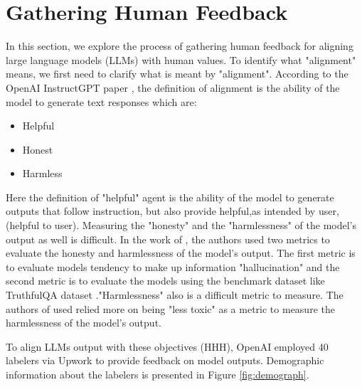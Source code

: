 \section{Gathering Human Feedback}
\label{sec:gather-feedback}

In this section, we explore the process of gathering human feedback for aligning large language models (LLMs) with human values. To identify what "alignment" means, we first need to clarify what is meant by "alignment". According to the OpenAI InstructGPT paper \cite{ouyangTrainingLanguageModels2022}, the definition of alignment is the ability of the model to generate text responses which are: 
\begin{itemize}
    \item Helpful
    \item Honest
    \item Harmless
\end{itemize}

Here the definition of "helpful" agent is the ability of the model to generate outputs that follow instruction, but also provide helpful,as intended by user, (helpful to user). Measuring the "honesty" and the "harmlessness" of the model's output as well is difficult. In the work of \cite{ouyangTrainingLanguageModels2022}, the authors used two metrics to evaluate the honesty and harmlessness of the model's output. The first metric is to evaluate models tendency 
to make up information "hallucination" and the second metric is to evaluate the models using the benchmark
dataset like TruthfulQA dataset \cite{linTruthfulQAMeasuringHow2022}."Harmlessness" also
is a difficult metric to measure. The authors of \cite{ouyangTrainingLanguageModels2022} used
relied more on being "less toxic" as a metric to measure the harmlessness of the model's output.

To align LLMs output with these objectives (HHH), OpenAI employed 40 labelers via Upwork to provide feedback on model outputs. Demographic information about the labelers is presented in Figure \ref{fig:demograph}. 


